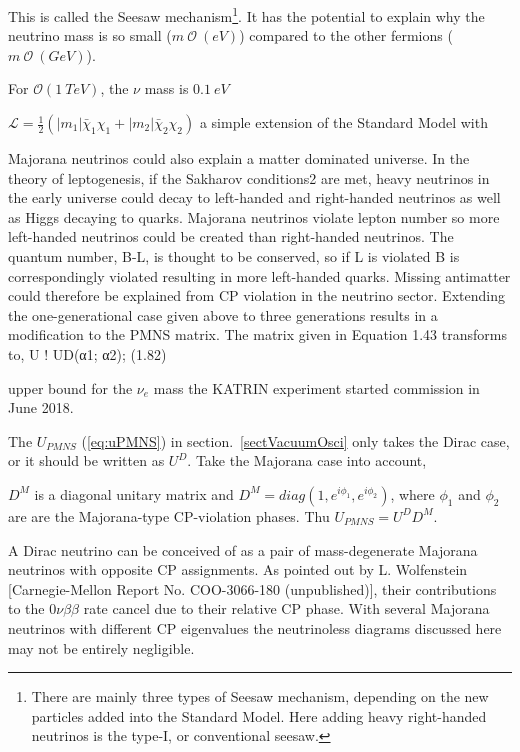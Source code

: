 This is called the Seesaw mechanism\footnote{There are mainly three types of Seesaw mechanism, depending on the new particles added into the Standard Model. Here adding heavy right-handed neutrinos is the type-I, or conventional seesaw\cite{xing2011neutrinos}.}. It has the potential to explain why the neutrino mass is so small ($m~\mathcal{O}~(eV)$) compared to the other fermions ($m~\mathcal{O}~(GeV)$).

For $\mathcal{O}(1~TeV)$, the $\nu$ mass is $0.1~eV$

$\mathcal L=\frac{1}{2}(|m_1|\bar\chi_1\chi_1+|m_2|\bar\chi_2\chi_2)$
a simple extension of the Standard Model with


Majorana neutrinos could also explain a matter dominated universe.
In the theory of leptogenesis, if the Sakharov conditions2 are met, heavy neutrinos in the
early universe could decay to left-handed and right-handed neutrinos as well as Higgs
decaying to quarks. Majorana neutrinos violate lepton number so more left-handed
neutrinos could be created than right-handed neutrinos. The quantum number, B-L,
is thought to be conserved, so if L is violated B is correspondingly violated resulting
in more left-handed quarks. Missing antimatter could therefore be explained from CP
violation in the neutrino sector.
Extending the one-generational case given above to three generations results in a
modification to the PMNS matrix. The matrix given in Equation 1.43 transforms to,
U ! UD(α1; α2); (1.82)



upper bound for the $\nu_e$ mass
the KATRIN experiment started commission in June 2018\cite{aker2019improved}.




The $U_{PMNS}$ (\ref{eq:uPMNS}) in section.~\ref{sectVacuumOsci} only takes the Dirac case, or it should be written as $U^D$. 
Take the Majorana case into account, 

$D^M$ is a diagonal unitary matrix and $D^M=diag(1,e^{i\phi_1},e^{i\phi_2})$, where $\phi_1$ and $\phi_2$ are are the Majorana-type CP-violation phases. Thu $U_{PMNS}=U^DD^M$.


A Dirac neutrino can be conceived of as a pair of
mass-degenerate Majorana neutrinos with opposite CP
assignments. As pointed out by L. Wolfenstein
[Carnegie-Mellon Report No. COO-3066-180 (unpublished)], their contributions to the $0\nu\beta\beta$ rate cancel due to their relative CP phase. With several Majorana neutrinos with different CP eigenvalues the neutrinoless diagrams discussed here may not be entirely negligible.

